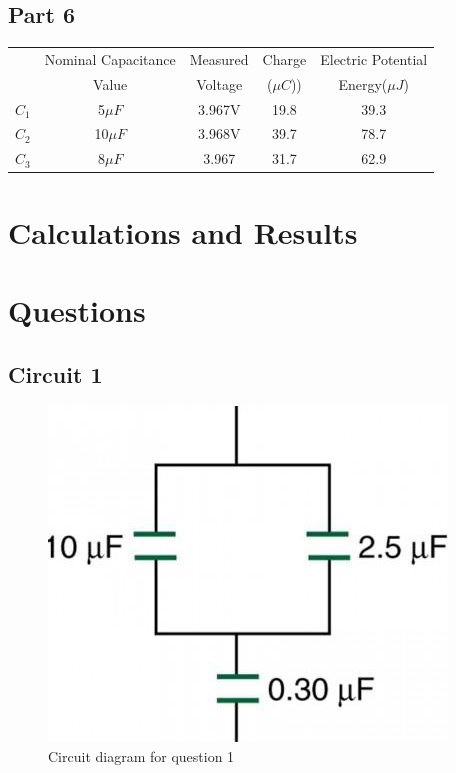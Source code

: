 \documentclass[titlepage]{article}
\begin{document}
	    \subsection{Part 6}
        \FloatBarrier
		\begin{table}[hbt!]
			\centering
			\begin{tabular}{c|c|c|c|c}
				& Nominal Capacitance & Measured & Charge & Electric Potential\\
				& Value & Voltage &($\mu C$)) & Energy($\mu J$)\\
				\hline
			$C_1$ & 5$\mu F$ & 3.967V& 19.8 & 39.3 \\ 
			$C_2$ & 10$\mu F$ & 3.968V& 39.7 & 78.7 \\ 
			$C_3$ & 8$\mu F$ & 3.967& 31.7 & 62.9\\ 

			\end{tabular}
	   	\end{table} 
        \FloatBarrier



    \section{Calculations and Results}




	\section{Questions}


    	\subsection{Circuit 1}

        \FloatBarrier
        \begin{figure}[hbt!]
            \centering
            \caption{Circuit diagram for question 1}
            \includegraphics{questions/1}
        \end{figure}
        \FloatBarrier
\end{document}
